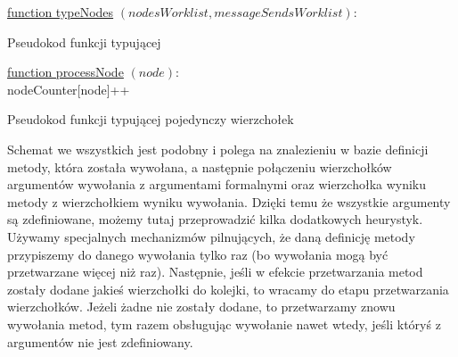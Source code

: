 \documentclass[declaration,shortabstract,mgr]{iithesis}
\newcommand{\algsize}{\small}
\begin{document}
\begin{algorithm}
    \algsize
    \underline{function typeNodes} $(\mathit{nodesWorklist}, \mathit{messageSendsWorklist})$:\\
    \caption{Pseudokod funkcji typującej}
    \label{alg:typeNodes}
\end{algorithm}

\begin{algorithm}
    \algsize
    \underline{function processNode} $(\mathit{node})$:\\
    nodeCounter[node]++\\
    \caption{Pseudokod funkcji typującej pojedynczy wierzchołek}
    \label{alg:processNode}
\end{algorithm}

Schemat we wszystkich jest podobny i polega na znalezieniu w bazie definicji metody, która została wywołana, a następnie połączeniu wierzchołków argumentów wywołania z argumentami formalnymi oraz wierzchołka wyniku metody z wierzchołkiem wyniku wywołania.
Dzięki temu że wszystkie argumenty są zdefiniowane, możemy tutaj przeprowadzić kilka dodatkowych heurystyk.
Używamy specjalnych mechanizmów pilnujących, że daną definicję metody przypiszemy do danego wywołania tylko raz (bo wywołania mogą być przetwarzane więcej niż raz).
Następnie, jeśli w efekcie przetwarzania metod zostały dodane jakieś wierzchołki do kolejki, to wracamy do etapu przetwarzania wierzchołków.
Jeżeli żadne nie zostały dodane, to przetwarzamy znowu wywołania metod, tym razem obsługując wywołanie nawet wtedy, jeśli któryś z argumentów nie jest zdefiniowany.
\end{document}

